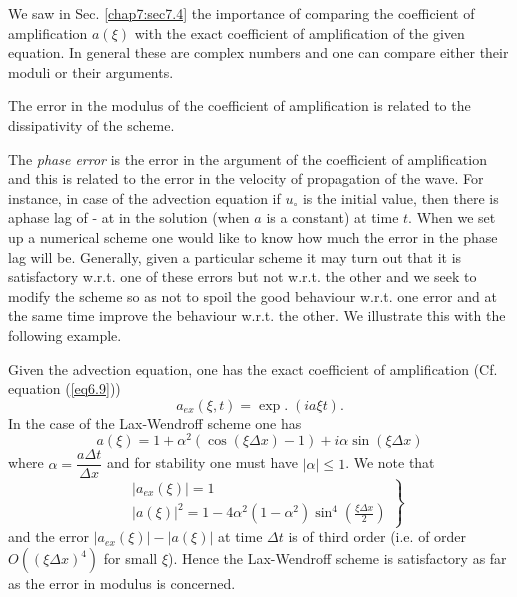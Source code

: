 We saw in Sec. \ref{chap7:sec7.4} the importance of comparing the coefficient of amplification $a(\xi)$ with the exact coefficient of amplification of the given equation. In general these are complex numbers and one can compare either their moduli or their arguments. 

The error in the modulus of the coefficient of amplification is related to the dissipativity of the scheme. 

The {\em phase error} is the error in the argument of the coefficient
of amplification and this is related to the error in the velocity of
propagation of the wave. For instance, in case of the advection
equation if $u_\circ$ is the initial value, then there is
a\pageoriginale phase lag of - at in the solution (when $a$ is a
constant) at time $t$. When we set up a  numerical scheme one would
like to know how much the error in the phase lag will be. Generally,
given a particular scheme it may turn out that it is satisfactory
w.r.t. one of these errors but not w.r.t. the other and we seek to
modify the scheme so as not to spoil the good behaviour w.r.t. one
error and at the same time improve the behaviour w.r.t. the other. We
illustrate this with the following example. 

Given the advection equation, one has the exact coefficient of amplification (Cf. equation (\ref{eq6.9}))
\begin{equation*}
a_{ex} (\xi, t) = \exp. \; (ia \xi t). 
\tag{8.37}\label{eq8.37}
\end{equation*}
In the case of the Lax-Wendroff scheme one has
\begin{equation*}
a(\xi) = 1 + \alpha^2 (\cos (\xi \Delta x) -1) + i \alpha \sin (\xi \Delta x)
\tag{8.38}\label{eq8.38}
\end{equation*}
where $\alpha = \dfrac{a \Delta t}{\Delta x}$ and for stability one must have $|\alpha| \leq 1$. We note that 
\begin{equation*}
\left.
\begin{aligned}
& |a_{ex} (\xi)| =1\\
& |a (\xi)|^2 = 1 -4 \alpha^2 (1-\alpha^2) \sin^4 \left(\frac{\xi
    \Delta x}{2}\right)  
\end{aligned}
 \right\}
\tag{8.39}\label{eq8.39}
\end{equation*}
and the error $|a_{ex}(\xi)| - |a(\xi)|$ at time $\Delta t$ is of third order (i.e. of order $O((\xi \Delta x)^4)$ for small $\xi$). Hence the Lax-Wendroff scheme is satisfactory as far as the error in modulus is concerned.

